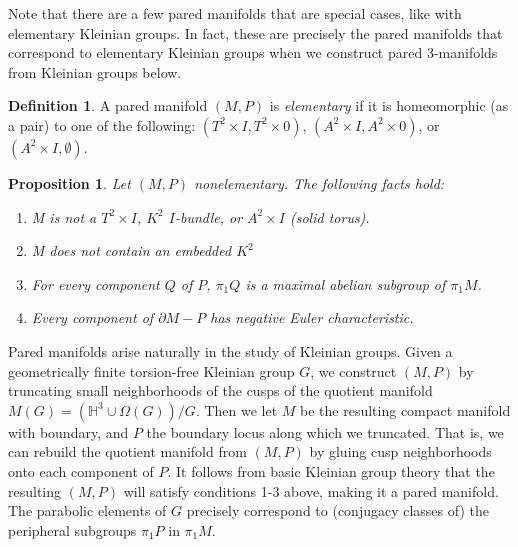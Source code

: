 \documentclass[12pt]{amsart}
\newtheorem{prop}[theorem]{Proposition}
\theoremstyle{definition}
\newtheorem{Def}[theorem]{Definition}
\newcommand{\x}{\times}
\newcommand{\bd}{\partial}
\newcommand{\Om}{\Omega}
\begin{document}
Note that there are a few pared manifolds that are special cases, like with
elementary Kleinian groups. In fact, these are precisely the pared manifolds
that correspond to elementary Kleinian groups when we construct pared
3-manifolds from Kleinian groups below.

\begin{Def}

A pared manifold $(M,P)$ is \emph{elementary} if it is homeomorphic (as a pair)
to one of the following: $(T^2\x I,T^2\x 0)$, $(A^2\x I,A^2\x 0)$, or $(A^2\x
I,\emptyset)$.

\end{Def}

\begin{prop}

Let $(M,P)$ nonelementary. The following facts hold:

\begin{enumerate}
\item M is not a $T^2\x I$, $K^2$ $I$-bundle, or $A^2\x I$ (solid torus).
\item M does not contain an embedded $K^2$
\item For every component $Q$ of $P$, $\pi_1Q$ is a maximal abelian subgroup of
$\pi_1M$.
\item Every component of $\bd M-P$ has negative Euler characteristic.
\end{enumerate}

\end{prop}

Pared manifolds arise naturally in the study of Kleinian groups. Given
a geometrically finite torsion-free Kleinian group $G$, we construct $(M,P)$ by
truncating small neighborhoods of the cusps of the quotient manifold $M(G)
= \left(\mathbb{H}^3\cup \Om(G)\right)/G$.  Then we let $M$ be the resulting
compact manifold with boundary, and $P$ the boundary locus along which we
truncated.  That is, we can rebuild the quotient manifold from $(M,P)$ by
gluing cusp neighborhoods onto each component of $P$. It follows from basic
Kleinian group theory that the resulting $(M,P)$ will satisfy conditions 1-3
above, making it a pared manifold.  The parabolic elements of $G$ precisely
correspond to (conjugacy classes of) the peripheral subgroups $\pi_1P$ in
$\pi_1M$.
\end{document}
